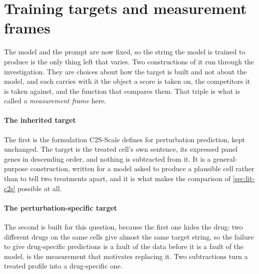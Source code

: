 \section{Training targets and measurement frames}
\label{sec:apparatus-vocab}

The model and the prompt are now fixed, so the string the model is trained to
produce is the only thing left that varies. Two constructions of it run through
the investigation. They are choices about how the target is built and not about
the model, and each carries with it the object a score is taken on, the
competitors it is taken against, and the function that compares them. That triple
is what is called a \emph{measurement frame} here.

\paragraph{The inherited target} The first is the formulation C2S-Scale defines
for perturbation prediction, kept unchanged. The target is the treated cell's
own sentence, its expressed panel genes in descending order, and nothing is
subtracted from it. It is a general-purpose construction, written for a model
asked to produce a plausible cell rather than to tell two treatments apart, and
it is what makes the comparison of \cref{sec:lit-c2s} possible at all.

\paragraph{The perturbation-specific target} The second is built for this
question, because the first one hides the drug: two different drugs on the same cells give
almost the same target string, so the failure to give drug-specific predictions is a fault of the data before it is a fault of the model.   is the measurement
that motivates replacing it. Two subtractions turn a treated profile into a
drug-specific one.

